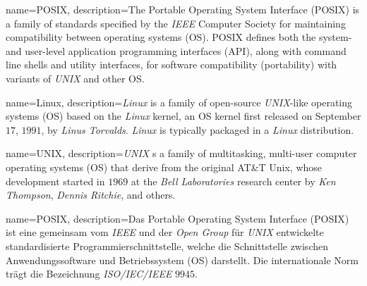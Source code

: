 
\fi

\ifenglish%
	{%
		name={POSIX},
		description={The Portable Operating System Interface (POSIX) is a family of standards specified by the \textit{IEEE} Computer Society for maintaining compatibility between operating systems (OS). POSIX defines both the system- and user-level application programming interfaces (API), along with command line shells and utility interfaces, for software compatibility (portability) with variants of \textit{UNIX} and other OS.}
	}

	{%
		name={Linux},
		description={\textit{Linux} is a family of open-source \textit{UNIX}-like operating systems (OS) based on the \textit{Linux} kernel, an OS kernel first released on September $17$, $1991$, by \textit{Linus Torvalds}. \textit{Linux} is typically packaged in a \textit{Linux} distribution.}
	}

	{%
		name={UNIX},
		description={\textit{UNIX} s a family of multitasking, multi-user computer operating systems (OS) that derive from the original AT&T Unix, whose development started in $1969$ at the \textit{Bell Laboratories} research center by \textit{Ken Thompson}, \textit{Dennis Ritchie}, and others.}
	}

\else

	{%
		name={POSIX},
		description={Das Portable Operating System Interface (POSIX) ist eine gemeinsam vom \textit{IEEE} und der \textit{Open Group} für \textit{UNIX} entwickelte standardisierte Programmierschnittstelle, welche die Schnittstelle zwischen Anwendungssoftware und Betriebssystem (OS) darstellt. Die internationale Norm trägt die Bezeichnung \textit{ISO/IEC/IEEE} $9945$.}
	}

